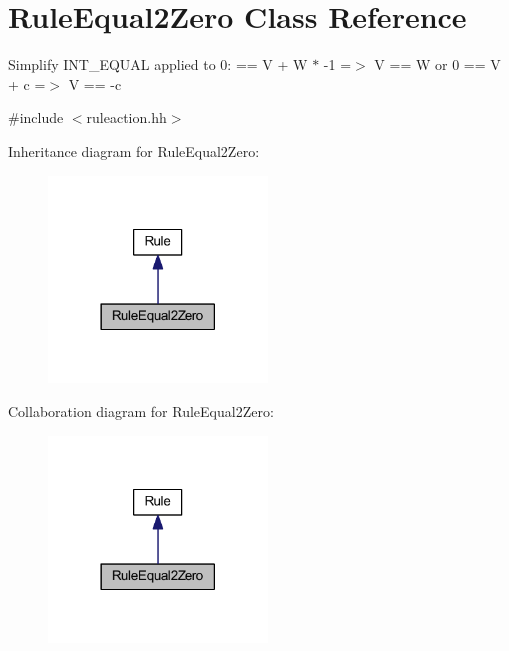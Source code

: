 \hypertarget{class_rule_equal2_zero}{}\section{Rule\+Equal2\+Zero Class Reference}
\label{class_rule_equal2_zero}


Simplify I\+N\+T\+\_\+\+E\+Q\+U\+AL applied to 0\+: { == V + W $\ast$ -\/1 =$>$ V == W or 0 == V + c =$>$ V == -\/c}  




{\ttfamily \#include $<$ruleaction.\+hh$>$}



Inheritance diagram for Rule\+Equal2\+Zero\+:
\nopagebreak
\begin{figure}[H]
\begin{center}
\leavevmode
\includegraphics[width=165pt]{class_rule_equal2_zero__inherit__graph}
\end{center}
\end{figure}


Collaboration diagram for Rule\+Equal2\+Zero\+:
\nopagebreak
\begin{figure}[H]
\begin{center}
\leavevmode
\includegraphics[width=165pt]{class_rule_equal2_zero__coll__graph}
\end{center}
\end{figure}
